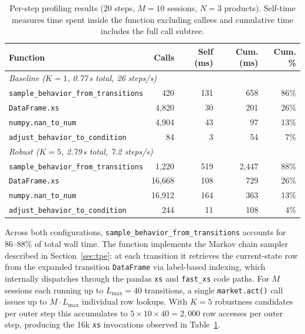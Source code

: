 \begin{table}[ht]
\centering
\caption{Per-step profiling results (20 steps, $M=10$ sessions, $N=3$ products). Self-time measures time spent inside the function excluding callees and cumulative time includes the full call subtree.}
\label{tab:profile_results}
\begingroup
\small
\setlength{\tabcolsep}{4pt}
\begin{tabular}{@{}lrrrr@{}}
\toprule
\textbf{Function} & \textbf{Calls} & \textbf{Self (ms)} & \textbf{Cum. (ms)} & \textbf{Cum. \%} \\
\midrule
\multicolumn{5}{l}{\textit{Baseline ($K=1$, 0.77\,s total, 26 steps/s)}} \\
\texttt{sample\_behavior\_from\_transitions} & 420 & 131 & 658 & 86\% \\
\texttt{DataFrame.xs} & 4,820 & 30 & 201 & 26\% \\
\texttt{numpy.nan\_to\_num} & 4,904 & 43 & 97 & 13\% \\
\texttt{adjust\_behavior\_to\_condition} & 84 & 3 & 54 & 7\% \\
\midrule
\multicolumn{5}{l}{\textit{Robust ($K=5$, 2.79\,s total, 7.2 steps/s)}} \\
\texttt{sample\_behavior\_from\_transitions} & 1,220 & 519 & 2,447 & 88\% \\
\texttt{DataFrame.xs} & 16,668 & 108 & 729 & 26\% \\
\texttt{numpy.nan\_to\_num} & 16,912 & 164 & 363 & 13\% \\
\texttt{adjust\_behavior\_to\_condition} & 244 & 11 & 108 & 4\% \\
\bottomrule
\end{tabular}
\endgroup
\end{table}

Across both configurations, \texttt{sample\_behavior\_from\_transitions} accounts for 86--88\% of total wall time. The function implements the Markov chain sampler described in Section~\ref{sec:tpe}: at each transition it retrieves the current-state row from the expanded transition \texttt{DataFrame} via label-based indexing, which internally dispatches through the pandas \texttt{xs} and \texttt{fast\_xs} code paths. For $M$ sessions each running up to $L_{\max}=40$ transitions, a single \texttt{market.act()} call issues up to $M \cdot L_{\max}$ individual row lookups. With $K=5$ robustness candidates per outer step this accumulates to $5 \times 10 \times 40 = 2{,}000$ row accesses per outer step, producing the 16k \texttt{xs} invocations observed in Table~\ref{tab:profile_results}.

